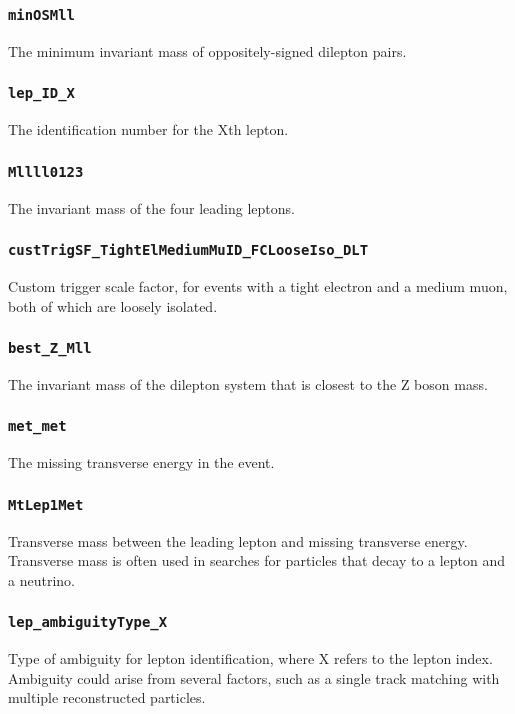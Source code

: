 \subsubsection{\texttt{minOSMll}} The minimum invariant mass of oppositely-signed dilepton pairs.

\subsubsection{\texttt{lep\_ID\_X}} The identification number for the Xth lepton.

\subsubsection{\texttt{Mllll0123}} The invariant mass of the four leading leptons.

\subsubsection{\texttt{custTrigSF\_TightElMediumMuID\_FCLooseIso\_DLT}} Custom trigger scale factor, for events with a
tight electron and a medium muon, both of which are loosely isolated.

\subsubsection{\texttt{best\_Z\_Mll}} The invariant mass of the dilepton system that is closest to the Z boson mass.

\subsubsection{\texttt{met\_met}} The missing transverse energy in the event.

\subsubsection{\texttt{MtLep1Met}} Transverse mass between the leading lepton and missing transverse energy. Transverse
mass is often used in searches for particles that decay to a lepton and a neutrino.

\subsubsection{\texttt{lep\_ambiguityType\_X}} Type of ambiguity for lepton identification, where X refers to the lepton
index. Ambiguity could arise from several factors, such as a single track matching with multiple reconstructed
particles.

